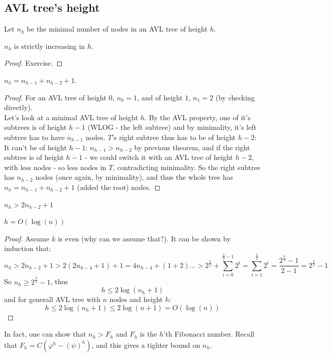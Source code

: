 \subsection{AVL tree's height}
Let $n_h$ be the minimal number of nodes in an AVL tree of height
$h$.\\
\begin{thm}
    $n_h$ is strictly increasing in $h$.
\end{thm}
\begin{proof} Exercise.
\end{proof}
\begin{thm}
$n_{h} = n_{h-1} + n_{h-2} + 1$.
\end{thm}
\begin{proof}For an AVL tree of height $0$, $n_0 = 1$,
and of height $1$, $n_1 = 2 $ (by checking directly).\\
    Let's look at a minimal AVL tree of height $h$. By the AVL property, one
of it's subtrees is of height $h-1$ (WLOG - the left subtree) and by
minimality, it's left subtree has to have $n_{h-1}$ nodes. $T$'s right subtree
thus has to be of height $h-2$: It can't be of height $h-1$: $n_{h-1} >
n_{h-2}$ by previous theorem, and if the right subtree is of height $h-1$ -
we could switch it with an AVL tree of height $h-2$, with less nodes - so
less nodes in $T$, contradicting minimality. So the right subtree has
$n_{h-2}$ nodes (once again, by minimality), and thus the whole tree has
    $n_{h} = n_{h-1} + n_{h-2} + 1$ (added the root) nodes.
\end{proof}
\begin{cor}$n_h > 2n_{h-2} + 1$
\end{cor}
\begin{cor}$h = O(\log(n))$
\end{cor}
\begin{proof}
    Assume $k$ is even (why can we assume that?).
    It can be shown by induction that:
    \[
        n_h>2n_{h-2}+1>2(2n_{h-4}+1)+1=4n_{h-4}+(1+2)\ldots >
        2^{\frac{h}{2}}+\sum_{i=0}^{\frac{h}{2}-1}
        2^i=\sum_{i=1}^{\frac{h}{2}}2^i = \frac{2^\frac{h}{2} - 1}{2-1} =  2^{\frac{h}{2}} - 1
    \]
    So $n_h \geq 2^{\frac{h}{2}} - 1$, thus
    \[
        h\leq 2\log(n_h + 1)
    \]
    and for generall AVL tree with $n$ nodes and height $h$:
    \[
         h\leq 2\log(n_h + 1) \leq 2\log(n + 1) = O(\log(n))
    \]
\end{proof}
\begin{remark}
    In fact, one can show that $n_h > F_h$ and $F_h$ is the $h$'th Fibonacci
    number. Recall that $F_h = C(\varphi^h - (\psi)^h)$, and this gives a
    tighter bound on $n_h$.
\end{remark}



